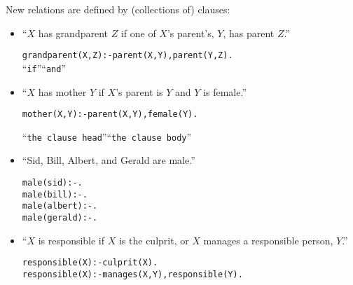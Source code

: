 \documentclass{popl}
\newenvironment{smalltt}{\begin{alltt}\smaller}{\end{alltt}}
\newcommand{\rmbox}[1]{\mbox{{\rm #1}}}
\begin{document}
\begin{foil}
New relations are defined by (collections of) clauses:

\begin{itemize}
\item 
``$X$ has grandparent $Z$ if one of $X$'s parent's, $Y$, has parent $Z$.''
\begin{smalltt}
        grandparent(X, Z) :- parent(X, Y), parent(Y, Z).
                         \rmbox{``if''}            \rmbox{``and''}
\end{smalltt}

\item ``$X$ has mother $Y$ if $X$'s parent is $Y$ and $Y$ is female.''
\begin{smalltt}
        mother(X, Y)    :-    parent(X, Y), female(Y).
        
        \rmbox{``the clause head''}       \rmbox{``the clause body''}
\end{smalltt}

\item ``Sid, Bill, Albert, and Gerald are male.''
\begin{smalltt}
        male(sid)    :- .
        male(bill)   :- .
        male(albert) :- .
        male(gerald) :- .
\end{smalltt}

\item ``$X$ is responsible if $X$ is the culprit, or $X$ manages a responsible person, $Y$.''
\begin{smalltt}
        responsible(X) :- culprit(X).
        responsible(X) :- manages(X, Y), responsible(Y).
\end{smalltt}
\end{itemize}
\end{foil}
\end{document}
